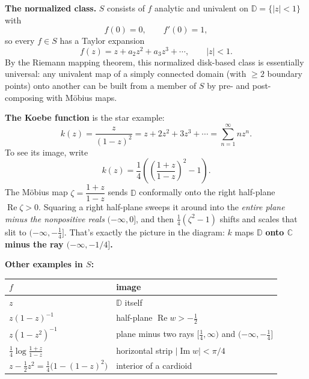 \documentclass[
]{book}
\newcounter{none} %
\theoremstyle{definition}
\theoremstyle{definition}
\theoremstyle{definition}
\theoremstyle{definition}
\theoremstyle{remark}
\begin{document}
\textbf{The normalized class.} \(S\) consists of \(f\) analytic and univalent on \(\mathbb D = \{|z|<1\}\) with
\[f(0)=0,\qquad f'(0)=1,\]
so every \(f\in S\) has a Taylor expansion
\[f(z) = z + a_2 z^2 + a_3 z^3 + \cdots, \qquad |z|<1.\]
By the Riemann mapping theorem, this normalized disk-based class is essentially universal: any univalent map of a simply connected domain (with \(\ge 2\) boundary points) onto another can be built from a member of \(S\) by pre- and post-composing with Möbius maps.

\textbf{The Koebe function} is the star example:
\[k(z) = \frac{z}{(1-z)^2} = z + 2z^2 + 3z^3 + \cdots = \sum_{n=1}^\infty n z^n.\]
To see its image, write
\[k(z) = \frac{1}{4}\left(\left(\frac{1+z}{1-z}\right)^2 - 1\right).\]
The Möbius map \(\zeta = \dfrac{1+z}{1-z}\) sends \(\mathbb D\) conformally onto the right half-plane \(\operatorname{Re}\zeta>0\). Squaring a right half-plane sweeps it around into the \emph{entire plane minus the nonpositive reals} \((-\infty,0]\), and then \(\frac14(\zeta^2-1)\) shifts and scales that slit to \((-\infty,-\tfrac14]\). That's exactly the picture in the diagram: \(k\) maps \(\mathbb D\) \textbf{onto \(\mathbb C\) minus the ray \((-\infty,-1/4]\).}

\textbf{Other examples in \(S\):}

{\def\LTcaptype{none} %
\begin{longtable}[]{@{}
  >{\raggedright\arraybackslash}p{}
  >{\raggedright\arraybackslash}p{}@{}}
\toprule\noalign{}
\begin{minipage}[b]{\linewidth}\raggedright
\(f\)
\end{minipage} & \begin{minipage}[b]{\linewidth}\raggedright
image
\end{minipage} \\
\midrule\noalign{}
\endhead
\bottomrule\noalign{}
\endlastfoot
\(z\) & \(\mathbb D\) itself \\
\(z(1-z)^{-1}\) & half-plane \(\operatorname{Re} w > -\tfrac12\) \\
\(z(1-z^2)^{-1}\) & plane minus two rays \([\tfrac14,\infty)\) and \((-\infty,-\tfrac14]\) \\
\(\tfrac14\log\frac{1+z}{1-z}\) & horizontal strip \(|\operatorname{Im} w| < \pi/4\) \\
\(z - \tfrac12 z^2 = \tfrac14\big(1-(1-z)^2\big)\) & interior of a cardioid \\
\end{longtable}
}
\end{document}
